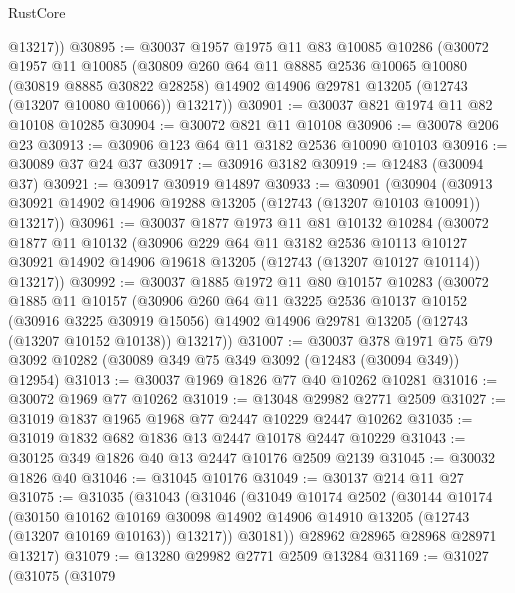 \begin{lexlean}{RustCore}
\begin{coremodule}
        @13217))
@30895 := @30037
    @1957
    @1975
    @11
    @83
    @10085
    @10286
    (@30072
      @1957
      @11
      @10085
      (@30809
        @260
        @64
        @11
        @8885
        @2536
        @10065
        @10080
        (@30819 @8885 @30822 @28258)
        @14902
        @14906
        @29781
        @13205
        (@12743 (@13207 @10080 @10066))
        @13217))
@30901 := @30037 @821 @1974 @11 @82 @10108 @10285
@30904 := @30072 @821 @11 @10108
@30906 := @30078 @206 @23
@30913 := @30906 @123 @64 @11 @3182 @2536 @10090 @10103
@30916 := @30089 @37 @24 @37
@30917 := @30916 @3182
@30919 := @12483 (@30094 @37)
@30921 := @30917 @30919 @14897
@30933 := @30901
    (@30904 (@30913 @30921 @14902 @14906 @19288 @13205 (@12743 (@13207 @10103 @10091)) @13217))
@30961 := @30037
    @1877
    @1973
    @11
    @81
    @10132
    @10284
    (@30072
      @1877
      @11
      @10132
      (@30906
        @229
        @64
        @11
        @3182
        @2536
        @10113
        @10127
        @30921
        @14902
        @14906
        @19618
        @13205
        (@12743 (@13207 @10127 @10114))
        @13217))
@30992 := @30037
    @1885
    @1972
    @11
    @80
    @10157
    @10283
    (@30072
      @1885
      @11
      @10157
      (@30906
        @260
        @64
        @11
        @3225
        @2536
        @10137
        @10152
        (@30916 @3225 @30919 @15056)
        @14902
        @14906
        @29781
        @13205
        (@12743 (@13207 @10152 @10138))
        @13217))
@31007 := @30037
    @378
    @1971
    @75
    @79
    @3092
    @10282
    (@30089 @349 @75 @349 @3092 (@12483 (@30094 @349)) @12954)
@31013 := @30037 @1969 @1826 @77 @40 @10262 @10281
@31016 := @30072 @1969 @77 @10262
@31019 := @13048 @29982 @2771 @2509
@31027 := @31019 @1837 @1965 @1968 @77 @2447 @10229 @2447 @10262
@31035 := @31019 @1832 @682 @1836 @13 @2447 @10178 @2447 @10229
@31043 := @30125 @349 @1826 @40 @13 @2447 @10176 @2509 @2139
@31045 := @30032 @1826 @40
@31046 := @31045 @10176
@31049 := @30137 @214 @11 @27
@31075 := @31035
    (@31043
      (@31046
        (@31049
          @10174
          @2502
          (@30144
            @10174
            (@30150
              @10162
              @10169
              @30098
              @14902
              @14906
              @14910
              @13205
              (@12743 (@13207 @10169 @10163))
              @13217))
          @30181))
      @28962
      @28965
      @28968
      @28971
      @13217)
@31079 := @13280 @29982 @2771 @2509 @13284
@31169 := @31027
    (@31075
      (@31079

\end{coremodule}
\end{lexlean}
